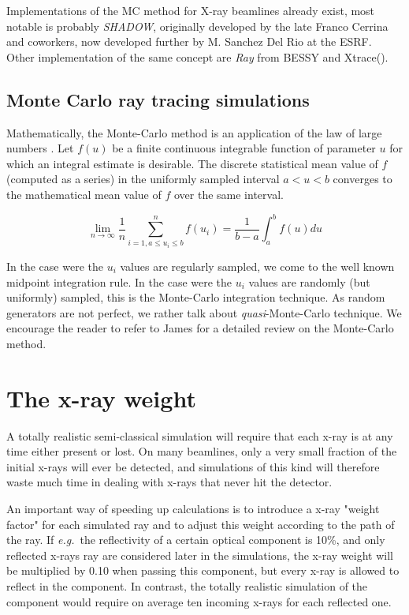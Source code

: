 Implementations of the MC method for X-ray beamlines already exist, most
notable is probably \emph{SHADOW}, originally developed by the late Franco
Cerrina and coworkers, now developed further by M. Sanchez Del Rio at the ESRF\cite{shadow_website}.
Other implementation of the same concept are \emph{Ray}\cite{RAY_website} from BESSY and Xtrace(\cite{Xtrace_website}).


\subsection{Monte Carlo ray tracing simulations}
Mathematically, the Monte-Carlo method is an application of the law of large numbers \cite{James80,Grimmett92}. Let $f(u)$ be a finite continuous integrable function of parameter $u$ for which an integral estimate is desirable. The discrete statistical mean value of $f$ (computed as a series) in the uniformly sampled interval $a < u < b$ converges to the mathematical mean value of $f$ over the same interval.

\begin{equation}
\lim_{n \rightarrow \infty} \frac{1}{n} \sum_{i=1, a \leq u_i \leq b}^n f(u_i) = \frac{1}{b-a}\int_a^b f(u) du
\end{equation}

In the case were the $u_i$ values are regularly sampled, we come to the well known midpoint integration rule. In the case were the $u_i$ values are randomly (but uniformly) sampled, this is the Monte-Carlo integration technique. As random generators are not perfect, we rather talk about \emph{quasi}-Monte-Carlo technique. We encourage the reader to refer to James \cite{James80} for a detailed review on the Monte-Carlo method.

\section{The x-ray weight}
\label{s:probweight}
A totally realistic semi-classical simulation will require that
each x-ray is at any time either present or lost.
On many beamlines, only a very
small fraction of the initial x-rays will ever be detected, and
simulations of this kind will therefore waste much time in dealing
with x-rays that never hit the detector.

An important way of speeding up calculations is to introduce
a x-ray "weight factor" for each simulated ray and to
adjust this weight according to the path of the ray.
If {\em e.g.}\ the reflectivity of a certain
optical component is 10\%, and only reflected x-rays ray are
considered later in the simulations, the x-ray
weight will be multiplied by 0.10 when passing this component,
but every x-ray is allowed to reflect in the component.
In contrast, the totally realistic simulation of the component
would require on average ten incoming x-rays for each reflected one.

